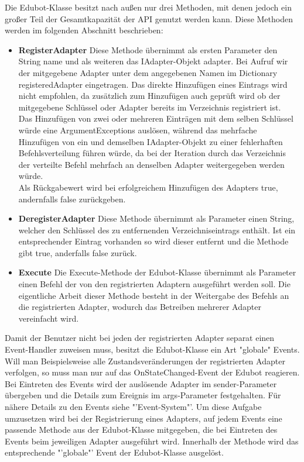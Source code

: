 Die Edubot-Klasse besitzt nach außen nur drei Methoden, mit denen jedoch ein großer Teil der Gesamtkapazität der API genutzt werden kann. Diese Methoden werden im folgenden Abschnitt beschrieben:
\begin{itemize}
\item \textbf{RegisterAdapter}
\newline
Diese Methode übernimmt als ersten Parameter den String name und als weiteren das IAdapter-Objekt adapter. Bei Aufruf wir der mitgegebene Adapter unter dem angegebenen Namen im Dictionary registeredAdapter eingetragen. Das direkte Hinzufügen eines Eintrags wird nicht empfohlen, da zusätzlich zum Hinzufügen auch geprüft wird ob der mitgegebene Schlüssel oder Adapter bereits im Verzeichnis registriert ist.\\
Das Hinzufügen von zwei oder mehreren Einträgen mit dem selben Schlüssel würde eine ArgumentExceptions auslösen, während das mehrfache Hinzufügen von ein und demselben IAdapter-Objekt zu einer fehlerhaften Befehlsverteilung führen würde, da bei der Iteration durch das Verzeichnis der verteilte Befehl mehrfach an denselben Adapter weitergegeben werden würde. \\
Als Rückgabewert wird bei erfolgreichem Hinzufügen des Adapters true, andernfalls false zurückgeben.
\item \textbf{DeregisterAdapter}
\newline
Diese Methode übernimmt als Parameter einen String, welcher den Schlüssel des zu entfernenden Verzeichniseintrags enthält. Ist ein entsprechender Eintrag vorhanden so wird dieser entfernt und die Methode gibt true, anderfalls false zurück.
\item \textbf{Execute}
\newline
Die Execute-Methode der Edubot-Klasse übernimmt als Parameter einen Befehl der von den registrierten Adaptern ausgeführt werden soll. Die eigentliche Arbeit dieser Methode besteht in der Weitergabe des Befehls an die registrierten Adapter, wodurch das Betreiben mehrerer Adapter vereinfacht wird. 
\end{itemize}

Damit der Benutzer nicht bei jeden der registrierten Adapter separat einen Event-Handler zuweisen muss, besitzt die Edubot-Klasse ein Art "globale" Events. Will man Beispielsweise alle Zustandsveränderungen der registrierten Adapter verfolgen, so muss man nur auf das OnStateChanged-Event der Edubot reagieren. Bei Eintreten des Events wird der auslösende Adapter im sender-Parameter übergeben und die Details zum Ereignis im args-Parameter festgehalten. Für nähere Details zu den Events siehe "'Event-System"'. Um diese Aufgabe umzusetzen wird bei der Registrierung eines Adapters, auf jedem Events eine passende Methode aus der Edubot-Klasse mitgegeben, die bei Eintreten des Events beim jeweiligen Adapter ausgeführt wird. Innerhalb der Methode wird das entsprechende "'globale"' Event der Edubot-Klasse ausgelöst.